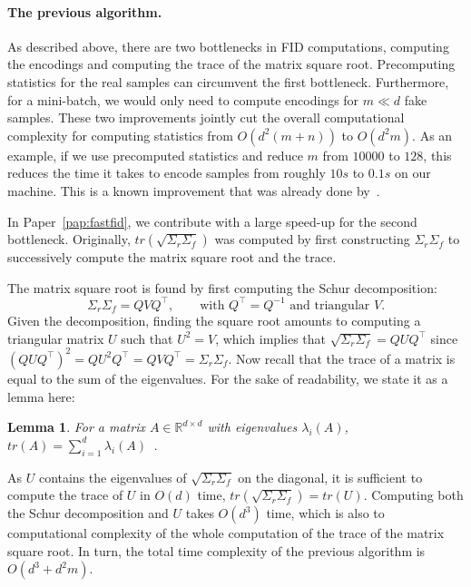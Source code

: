 \documentclass[11pt,a4paper,twoside,openright,final]{memoir}
\newtheorem{lemma}{Lemma}
\newcommand*{\paperref}[1]{Paper~\hyperref[#1]{\ref{#1}}}
\begin{document}
\paragraph{The previous algorithm.} As described above, there are two bottlenecks in FID computations, computing the encodings and computing the trace of the matrix square root.
Precomputing statistics for the real samples can circumvent the first bottleneck.
Furthermore, for a mini-batch, we would only need to compute encodings for $m \ll d$ fake samples.
These two improvements jointly cut the overall computational complexity for computing statistics from $O(d^2(m+n))$ to $O(d^2m)$.
As an example, if we use precomputed statistics and reduce $m$ from $10 000$ to $128$, this reduces the time it takes to encode samples from roughly $10s$ to $0.1s$ on our machine.
This is a known improvement that was already done by~\cite{fid}.

In \paperref{pap:fastfid}, we contribute with a large speed-up for the second bottleneck.
Originally, $tr( \sqrt{\Sigma_r \Sigma_f} )$ was computed by first constructing $\Sigma_r \Sigma_f$ to successively compute the matrix square root and the trace.

The matrix square root is found by first computing the Schur decomposition:
\begin{equation}\label{eq:schur}
    \Sigma_r\Sigma_f = QVQ^\intercal, \qquad \text{with }Q^\intercal = Q^{-1}\text{ and triangular }V.
\end{equation}
Given the decomposition, finding the square root amounts to computing a triangular matrix $U$ such that $U^2 = V$, which implies that $\sqrt{\Sigma_r \Sigma_f} = QUQ^\intercal$ since $(QUQ^\intercal)^2 = QU^2Q^\intercal = QVQ^\intercal = \Sigma_r\Sigma_f$.
Now recall that the trace of a matrix is equal to the sum of the eigenvalues.
For the sake of readability, we state it as a lemma here:
\begin{lemma}\label{lem:trase-eigenvalues}
    For a matrix $A\in\mathbb{R}^{d\times d}$ with eigenvalues $\lambda_i(A)$, $tr(A) = \sum_{i=1}^{d}\lambda_i(A)$~\cite{matrix-cookbook}.
\end{lemma}
As $U$ contains the eigenvalues of $\sqrt{\Sigma_r\Sigma_f}$ on the diagonal, it is sufficient to compute the trace of $U$ in $O(d)$ time, $tr(\sqrt{\Sigma_r\Sigma_f}) = tr(U)$.
Computing both the Schur decomposition and $U$ takes $O(d^3)$ time, which is also to computational complexity of the whole computation of the trace of the matrix square root.
In turn, the total time complexity of the previous algorithm is $O(d^3 + d^2m)$.
\end{document}
